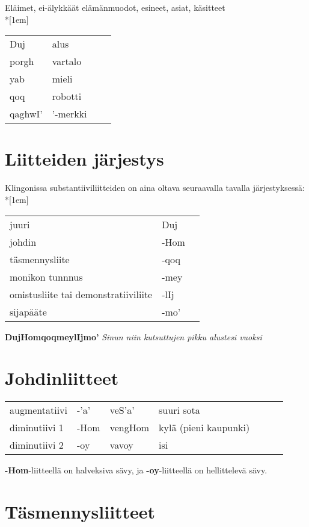 \documentclass{book}
\begin{document}
Eläimet, ei-älykkäät elämänmuodot, esineet, asiat, käsitteet\\*[1em]
\begin{tabular}{Bl Il}
Duj & alus \\
porgh & vartalo \\
yab & mieli \\
qoq & robotti \\
qaghwI' & '-merkki \\
\end{tabular}

\section{Liitteiden järjestys}

Klingonissa substantiiviliitteiden on aina oltava seuraavalla tavalla järjestyksessä:\\*[1em]
\begin{tabular}{l Bl}
juuri & Duj \\
johdin & -Hom \\
täsmennysliite & -qoq \\
monikon tunnnus & -mey \\
omistusliite tai demonstratiiviliite & -lIj \\
sijapääte & -mo' \\
\end{tabular}

\textbf{DujHomqoqmeylIjmo'} \textit{Sinun niin kutsuttujen pikku alustesi vuoksi}

\section{Johdinliitteet}

\begin{tabular}{l Bl | Bl Il}
    augmentatiivi & -'a' & veS'a' & suuri sota \\
    diminutiivi 1 & -Hom & vengHom & kylä (pieni kaupunki) \\
    diminutiivi 2 & -oy & vavoy & isi \\
\end{tabular}

\textbf{-Hom}-liitteellä on halveksiva sävy, ja \textbf{-oy}-liitteellä on hellittelevä sävy.

\section{Täsmennysliitteet}
\end{document}
